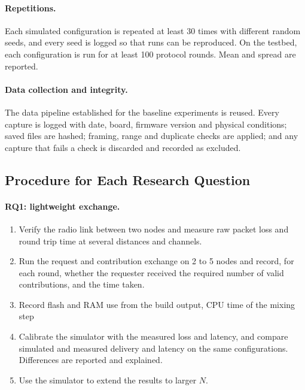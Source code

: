 \documentclass[a4paper, 12pt]{article}
\begin{document}
\paragraph{Repetitions.} Each simulated configuration is repeated at least 30 times with different random seeds, and every seed is logged so that runs can be reproduced. On the testbed, each configuration is run for at least 100 protocol rounds. Mean and spread are reported.
 
\paragraph{Data collection and integrity.} The data pipeline established for the baseline experiments is reused. Every capture is logged with date, board, firmware version and physical conditions; saved files are hashed; framing, range and duplicate checks are applied; and any capture that fails a check is discarded and recorded as excluded.
 
\subsection{Procedure for Each Research Question}
 
\paragraph{RQ1: lightweight exchange.}
\begin{enumerate}
    \item Verify the radio link between two nodes and measure raw packet loss and round trip time at several distances and channels.
    \item Run the request and contribution exchange on 2 to 5 nodes and record, for each round, whether the requester received the required number of valid contributions, and the time taken.
    \item Record flash and RAM use from the build output, CPU time of the mixing step
    \item Calibrate the simulator with the measured loss and latency, and compare simulated and measured delivery and latency on the same configurations. Differences are reported and explained.
    \item Use the simulator to extend the results to larger $N$.
\end{enumerate}
 
\end{document}
